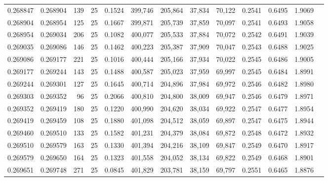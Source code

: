 \begin{tabular}{rrrrrrrrrrrrr}
0.268847 & 0.268904 &   139 &  25 &                                     0.1524 & 399,746 & 205,864 &  37,834 &  70,122 & 0.2541 & 0.6495 & 1.9069 \\
0.268904 & 0.268954 &   125 &  25 &                                     0.1667 & 399,871 & 205,739 &  37,859 &  70,097 & 0.2541 & 0.6493 & 1.9058 \\
0.268954 & 0.269034 &   206 &  25 &                                     0.1082 & 400,077 & 205,533 &  37,884 &  70,072 & 0.2542 & 0.6491 & 1.9039 \\
0.269035 & 0.269086 &   146 &  25 &                                     0.1462 & 400,223 & 205,387 &  37,909 &  70,047 & 0.2543 & 0.6488 & 1.9025 \\
0.269086 & 0.269177 &   221 &  25 &                                     0.1016 & 400,444 & 205,166 &  37,934 &  70,022 & 0.2545 & 0.6486 & 1.9005 \\
0.269177 & 0.269244 &   143 &  25 &                                     0.1488 & 400,587 & 205,023 &  37,959 &  69,997 & 0.2545 & 0.6484 & 1.8991 \\
0.269244 & 0.269301 &   127 &  25 &                                     0.1645 & 400,714 & 204,896 &  37,984 &  69,972 & 0.2546 & 0.6482 & 1.8980 \\
0.269303 & 0.269352 &    96 &  25 &                                     0.2066 & 400,810 & 204,800 &  38,009 &  69,947 & 0.2546 & 0.6479 & 1.8971 \\
0.269352 & 0.269419 &   180 &  25 &                                     0.1220 & 400,990 & 204,620 &  38,034 &  69,922 & 0.2547 & 0.6477 & 1.8954 \\
0.269419 & 0.269459 &   108 &  25 &                                     0.1880 & 401,098 & 204,512 &  38,059 &  69,897 & 0.2547 & 0.6475 & 1.8944 \\
0.269460 & 0.269510 &   133 &  25 &                                     0.1582 & 401,231 & 204,379 &  38,084 &  69,872 & 0.2548 & 0.6472 & 1.8932 \\
0.269510 & 0.269579 &   163 &  25 &                                     0.1330 & 401,394 & 204,216 &  38,109 &  69,847 & 0.2549 & 0.6470 & 1.8917 \\
0.269579 & 0.269650 &   164 &  25 &                                     0.1323 & 401,558 & 204,052 &  38,134 &  69,822 & 0.2549 & 0.6468 & 1.8901 \\
0.269651 & 0.269748 &   271 &  25 &                                     0.0845 & 401,829 & 203,781 &  38,159 &  69,797 & 0.2551 & 0.6465 & 1.8876 \\

\end{tabular}
